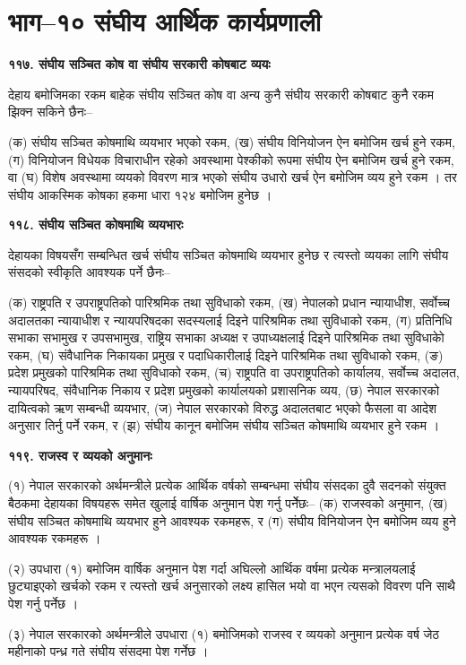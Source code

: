 \section{भाग–१० संघीय आर्थिक कार्यप्रणाली}

\textbf{११७. संघीय सञ्चित कोष वा संघीय सरकारी कोषबाट व्ययः}

देहाय बमोजिमका रकम बाहेक संघीय सञ्चित कोष वा अन्य कुनै संघीय सरकारी कोषबाट कुनै रकम झिक्न सकिने छैनः–

(क) संघीय सञ्चित कोषमाथि व्ययभार भएको रकम,
(ख) संघीय विनियोजन ऐन बमोजिम खर्च हुने रकम,
(ग) विनियोजन विधेयक विचाराधीन रहेको अवस्थामा पेश्कीको रूपमा संघीय ऐन बमोजिम खर्च हुने रकम, वा
(घ) विशेष अवस्थामा व्ययको विवरण मात्र भएको संघीय उधारो खर्च ऐन बमोजिम व्यय हुने रकम । तर संघीय आकस्मिक कोषका हकमा धारा १२४ बमोजिम हुनेछ ।

\textbf{११८. संघीय सञ्चित कोषमाथि व्ययभारः}

देहायका विषयसँग सम्बन्धित खर्च संघीय सञ्चित कोषमाथि व्ययभार हुनेछ र त्यस्तो व्ययका लागि संघीय संसदको स्वीकृति आवश्यक पर्ने छैनः–

(क) राष्ट्रपति र उपराष्ट्रपतिको पारिश्रमिक तथा सुविधाको रकम,
(ख) नेपालको प्रधान न्यायाधीश, सर्वोच्च अदालतका न्यायाधीश र न्यायपरिषदका सदस्यलाई दिइने पारिश्रमिक तथा सुविधाको रकम,
(ग) प्रतिनिधि सभाका सभामुख र उपसभामुख, राष्ट्रिय सभाका अध्यक्ष र उपाध्यक्षलाई दिइने पारिश्रमिक तथा सुविधाकोे रकम,
(घ) संवैधानिक निकायका प्रमुख र पदाधिकारीलाई दिइने पारिश्रमिक तथा सुविधाको रकम,
(ङ) प्रदेश प्रमुखको पारिश्रमिक तथा सुविधाको रकम,
(च) राष्ट्रपति वा उपराष्ट्रपतिको कार्यालय, सर्वोच्च अदालत, न्यायपरिषद, संवैधानिक निकाय र प्रदेश प्रमुखको कार्यालयको प्रशासनिक व्यय,
(छ) नेपाल सरकारको दायित्वको ऋण सम्बन्धी व्ययभार,
(ज) नेपाल सरकारको विरुद्ध अदालतबाट भएको फैसला वा आदेश अनुसार तिर्नु पर्ने रकम, र
(झ) संघीय कानून बमोजिम संघीय सञ्चित कोषमाथि व्ययभार हुने रकम ।

\textbf{११९. राजस्व र व्ययको अनुमानः}

(१) नेपाल सरकारको अर्थमन्त्रीले प्रत्येक आर्थिक वर्षको सम्बन्धमा संघीय संसदका दुवै सदनको संयुक्त बैठकमा देहायका विषयहरू समेत खुलाई वार्षिक अनुमान पेश गर्नु पर्नेेछः–
(क) राजस्वको अनुमान,
(ख) संघीय सञ्चित कोषमाथि व्ययभार हुने आवश्यक रकमहरू, र
(ग) संघीय विनियोजन ऐन बमोजिम व्यय हुने आवश्यक रकमहरू ।

(२) उपधारा (१) बमोजिम वार्षिक अनुमान पेश गर्दा अघिल्लो आर्थिक वर्षमा प्रत्येक मन्त्रालयलाई छुट्याइएको खर्चको रकम र त्यस्तो खर्च
अनुसारको लक्ष्य हासिल भयो वा भएन त्यसको विवरण पनि साथै पेश गर्नु पर्नेछ ।

(३) नेपाल सरकारको अर्थमन्त्रीले उपधारा (१) बमोजिमको राजस्व र व्ययको अनुमान प्रत्येक वर्ष जेठ महीनाको पन्ध्र गते संघीय संसदमा पेश गर्नेछ ।

